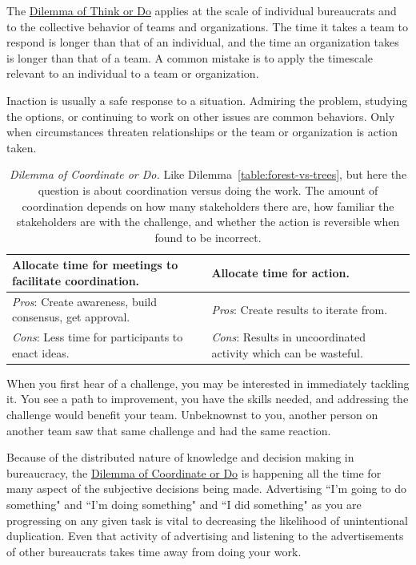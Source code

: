 The \href{table:forest-vs-trees}{Dilemma of Think or Do} applies at the scale of individual bureaucrats and to the collective behavior of teams and organizations. The time it takes a team to respond is longer than that of an individual, and the time an organization takes is longer than that of a team.  A common mistake is to apply the timescale relevant to an individual to a team or organization.

Inaction is usually a safe response to a situation. Admiring the problem, studying the options, or continuing to work on other issues are common behaviors. Only when circumstances threaten relationships or the team or organization is action taken.

\begin{center}
\begin{table}[H] %
\begin{tabular}{ | m{\dilemmatablewidth}| m{\dilemmatablewidth} | } 
  \hline
  \textbf{Allocate time for meetings to facilitate coordination.} &
  \textbf{Allocate time for action.} \\
  \hline
  \textit{Pros}: Create awareness, build consensus, get approval. &
  \textit{Pros}: Create results to iterate from. \\
  \hline
  \textit{Cons}: Less time for participants to enact ideas. & 
  \textit{Cons}: Results in uncoordinated activity which can be wasteful. \\
  \hline
\end{tabular}
\caption{\textit{Dilemma of Coordinate or Do.}
Like Dilemma~\ref{table:forest-vs-trees}, but here the question is about coordination versus doing the work. The amount of coordination depends on how many stakeholders there are, how familiar the stakeholders are with the challenge, and whether the action is reversible when found to be incorrect.
}
\label{table:meetings-versus-work}
\end{table}
\end{center}

When you first hear of a challenge, you may be interested in immediately tackling it. You see a path to improvement, you have the skills needed, and addressing the challenge would benefit your team. Unbeknownst to you, another person on another team saw that same challenge and had the same reaction. 

Because of the distributed nature of knowledge and decision making in bureaucracy, the \href{table:meetings-versus-work}{Dilemma of Coordinate or Do}
is happening all the time for many aspect of the subjective decisions being made. Advertising ``I'm going to do something" and ``I'm doing something" and ``I did something" as you are progressing on any given task is vital to decreasing the likelihood of unintentional duplication. Even that activity of advertising and listening to the advertisements of other bureaucrats takes time away from doing your work. 


